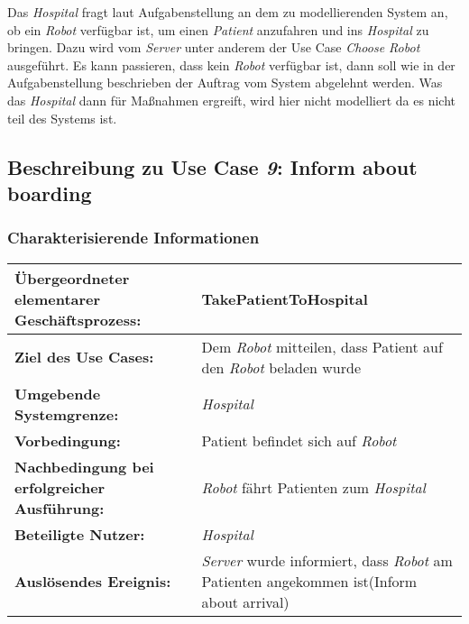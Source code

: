 			Das \emph{Hospital} fragt laut Aufgabenstellung an dem zu modellierenden System an, ob ein \emph{Robot} verfügbar ist, um einen \emph{Patient} anzufahren und ins \emph{Hospital} zu bringen. Dazu wird vom \emph{Server} unter anderem der Use Case \emph{Choose Robot} ausgeführt. Es kann passieren, dass kein \emph{Robot} verfügbar ist, dann soll wie in der Aufgabenstellung beschrieben der Auftrag vom System abgelehnt werden. Was das \emph{Hospital} dann für Maßnahmen ergreift, wird hier nicht modelliert da es nicht teil des Systems ist.


	\pagebreak
		\subsection{Beschreibung zu Use Case \emph{9}: Inform about boarding}

			\subsubsection*{Charakterisierende Informationen}

			\begin{table}[H]
				\centering
				\begin{tabularx}{\textwidth}{@{}p{5cm}X@{}}
				\hline
				\textbf{Übergeordneter elementarer Geschäftsprozess:} & TakePatientToHospital   \\ \hline
				\textbf{Ziel des Use Cases:} & Dem \emph{Robot} mitteilen, dass Patient auf den \emph{Robot} beladen wurde \\ \hline
				\textbf{Umgebende Systemgrenze:} & \emph{Hospital} \\ \hline
				\textbf{Vorbedingung:} & Patient befindet sich auf \emph{Robot}\\ \hline
				\textbf{Nachbedingung bei erfolgreicher Ausführung:} & \emph{Robot} fährt Patienten zum \emph{Hospital} \\ \hline
				\textbf{Beteiligte Nutzer:} & \emph{Hospital}\\ \hline
				\textbf{Auslösendes Ereignis:} & \emph{Server} wurde informiert, dass \emph{Robot} am Patienten angekommen ist(Inform about arrival)\\
				\hline
				\end{tabularx}
			\end{table}
			
